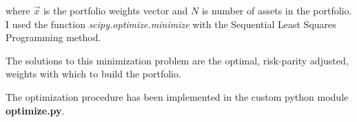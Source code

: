 where $\vec{x}$ is the portfolio weights vector and $N$ is number of assets in the portfolio. I used the function \textit{scipy.optimize.minimize} with the Sequential Least Squares Programming method.

The solutions to this minimization problem are the optimal, risk-parity adjusted, weights with which to build the portfolio.

The optimization procedure has been implemented in the custom python module \textbf{optimize.py}.

\clearpage